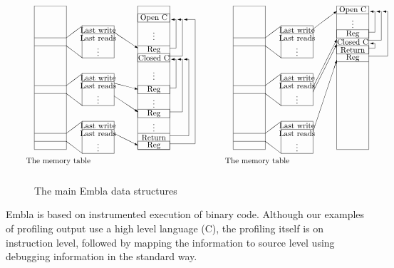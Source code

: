 \begin{figure*}
\small
\hrulefill
\[
\begin{picture}(250,210)(-30,0)
\put(-30,30){\framebox(40,180)[t]{\ }}
\put(-30,10){\makebox(60,10){The memory table}}
\put(-30,145){\rwblock}
\put(70,177){\vector(3,-2){30}}
\put(-30,85){\rwblock}
\put(70,113){\vector(4,-1){30}}
\put(70,97){\vector(3,-2){30}}
\put(-30,25){\rwblock}
\put(70,50){\vector(2,-1){30}}
\put(100,30){\framebox(40,180)[t]{\ }}
\put(100,190){\framebox(40,10){Open C}}
\put(100,170){\makebox(40,10){\vdots}}
\put(100,160){\line(1,0){40}}
\put(100,150){\makebox(40,10){Reg}}
\put(140,157){\backlink{8}{36}{6}}
\put(100,140){\framebox(40,10){Closed C}}
\put(140,147){\backlink{16}{46}{6}}
\put(100,120){\makebox(40,10){\vdots}}
\put(100,100){\framebox(40,10){Reg}}
\put(140,107){\backlink{8}{36}{6}}
\put(100,85){\makebox(40,10){\vdots}}
\put(100,70){\framebox(40,10){Reg}}
\put(140,77){\backlink{16}{66}{6}}
\put(100,50){\line(1,0){40}}
\put(100,55){\makebox(40,10){\vdots}}
\put(100,40){\makebox(40,10){Return}}
\put(140,47){\backlink{24}{96}{6}}
\put(100,30){\framebox(40,10){Reg}}
\put(140,37){\backlink{32}{156}{14}}
\end{picture}
%
%
\begin{picture}(200,210)(-30,0)
\put(-30,30){\framebox(40,180)[t]{\ }}
\put(-30,10){\makebox(60,10){The memory table}}
\put(-30,145){\rwblock}
\put(70,181){\vector(4,3){30}}
\put(-30,85){\rwblock}
\put(70,108){\vector(1,2){30}}
\put(70,102){\vector(1,2){30}}
\put(-30,25){\rwblock}
\put(70,52){\vector(1,3){30}}
\put(100,30){\framebox(40,180)[t]{\ }}
\put(100,200){\makebox(40,10){Open C}}
\put(100,200){\line(1,0){40}}
\put(100,185){\makebox(40,10){\vdots}}
\put(100,170){\framebox(40,10){Reg}}
\put(140,177){\backlink{8}{26}{6}}
\put(100,160){\makebox(40,10){Closed C}}
\put(140,167){\backlink{16}{36}{6}}
\put(100,150){\framebox(40,10){Return}}
\put(140,157){\backlink{8}{6}{6}}
\put(100,140){\makebox(40,10){Reg}}
\put(140,147){\backlink{24}{56}{6}}
\put(100,140){\line(1,0){40}}
\end{picture}
\]
\hrulefill
\caption{The main Embla data structures}
\label{fnyembladata}
\end{figure*}


Embla is based on instrumented execution of binary code. Although
our examples of profiling output use a high level language (C),
the profiling itself is on instruction level, followed by 
mapping the information to source level using debugging information 
in the standard way.

